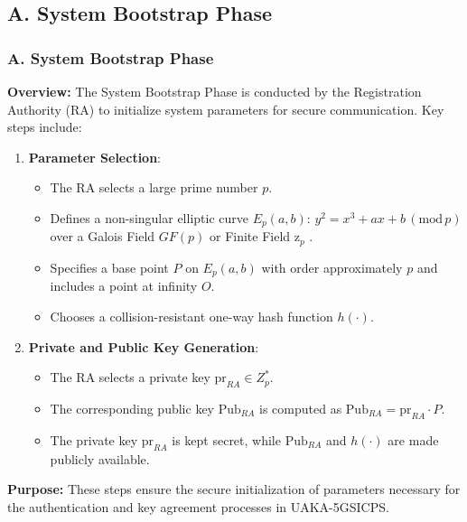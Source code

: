 \documentclass[9pt,handout]{beamer}
\begin{document}
\subsection{A. System Bootstrap Phase}
\begin{frame}
    \frametitle{A. System Bootstrap Phase}
    \textbf{Overview:} The System Bootstrap Phase is conducted by the Registration Authority (RA) to initialize system parameters for secure communication. Key steps include:

    \begin{enumerate}
        \item \textbf{Parameter Selection}:
        \begin{itemize}
            \item The RA selects a large prime number \( p \).
            \item Defines a non-singular elliptic curve \( E_p(a, b) \): \( y^2 = x^3 + ax + b \, (\text{mod} \, p) \) over a Galois Field \( GF(p) \) or Finite Field  \( \text{z}_{p} \) .
            \item Specifies a base point \( P \) on \( E_p(a, b) \) with order approximately \( p \) and includes a point at infinity \( O \).
            \item Chooses a collision-resistant one-way hash function \( h(\cdot) \).
        \end{itemize}
        
        \item \textbf{Private and Public Key Generation}:
        \begin{itemize}
            \item The RA selects a private key \( \text{pr}_{RA} \in Z^*_p \).
            \item The corresponding public key \( \text{Pub}_{RA} \) is computed as \( \text{Pub}_{RA} = \text{pr}_{RA} \cdot P \).
            \item The private key \( \text{pr}_{RA} \) is kept secret, while \( \text{Pub}_{RA} \) and \( h(\cdot) \) are made publicly available.
        \end{itemize}
    \end{enumerate}

    \textbf{Purpose:} These steps ensure the secure initialization of parameters necessary for the authentication and key agreement processes in UAKA-5GSICPS.
\end{frame}
\end{document}
